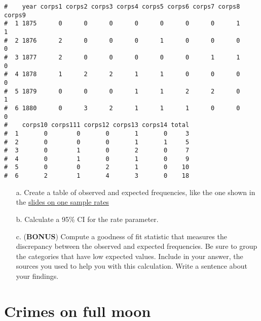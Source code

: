 \documentclass[letterpaper,9pt,twoside,printwatermark=false]{pinp}
\begin{document}
\begin{Shaded}
\begin{Highlighting}[]
\StringTok{ }\NormalTok{(}\NormalTok{)}
\end{Highlighting}
\end{Shaded}

\begin{ShadedResult}
\begin{verbatim}
#    year corps1 corps2 corps3 corps4 corps5 corps6 corps7 corps8 corps9
#  1 1875      0      0      0      0      0      0      0      1      1
#  2 1876      2      0      0      0      1      0      0      0      0
#  3 1877      2      0      0      0      0      0      1      1      0
#  4 1878      1      2      2      1      1      0      0      0      0
#  5 1879      0      0      0      1      1      2      2      0      1
#  6 1880      0      3      2      1      1      1      0      0      0
#    corps10 corps111 corps12 corps13 corps14 total
#  1       0        0       0       1       0     3
#  2       0        0       0       1       1     5
#  3       0        1       0       2       0     7
#  4       0        1       0       1       0     9
#  5       0        0       2       1       0    10
#  6       2        1       4       3       0    18
\end{verbatim}
\end{ShadedResult}

\begin{enumerate}

\item[a.] Create a table of observed and expected frequencies, like the one shown in the \href{https://github.com/sahirbhatnagar/EPIB607/raw/master/slides/one_sample_rate/EPIB607_one_sample_rate.pdf}{slides on one sample rates}

\item[b.] Calculate a 95\% CI for the rate parameter.

\item[c.] (\textbf{BONUS}) Compute a goodness of fit statistic that measures the discrepancy between the observed and expected frequencies. Be sure to group the categories that have low expected values. Include in your answer, the sources you used to help you with this calculation. Write a sentence about your findings.
\end{enumerate}

\section{Crimes on full moon}\label{crimes-on-full-moon}
\end{document}
